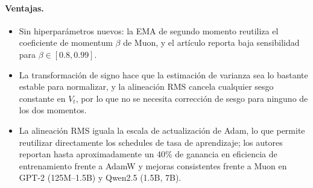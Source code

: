 \paragraph{Ventajas.}
\begin{itemize}[leftmargin=*]
\item Sin hiperparámetros nuevos: la EMA de segundo momento reutiliza el coeficiente de momentum $\beta$ de Muon, y el artículo reporta baja sensibilidad para $\beta \in [0.8, 0.99]$.
\item La transformación de signo hace que la estimación de varianza sea lo bastante estable para normalizar, y la alineación RMS cancela cualquier sesgo constante en $V_t$, por lo que no se necesita corrección de sesgo para ninguno de los dos momentos.
\item La alineación RMS iguala la escala de actualización de Adam, lo que permite reutilizar directamente los schedules de tasa de aprendizaje; los autores reportan hasta aproximadamente un 40\% de ganancia en eficiencia de entrenamiento frente a AdamW y mejoras consistentes frente a Muon en GPT-2 (125M--1.5B) y Qwen2.5 (1.5B, 7B).
\end{itemize}

